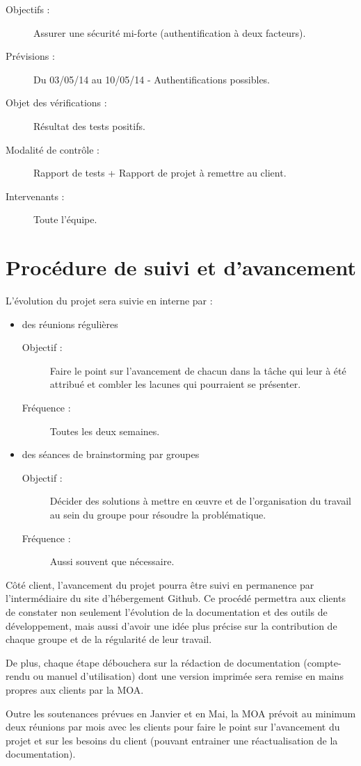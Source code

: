 \documentclass{../../res/univ-projet}
\begin{document}
\begin{description}
	\begin{description}
		\item[Objectifs :] Assurer une sécurité mi-forte (authentification à deux facteurs).
		\item[Prévisions :] Du 03/05/14 au 10/05/14 - Authentifications possibles.
		\item[Objet des vérifications :] Résultat des tests positifs.
		\item[Modalité de contrôle :] Rapport de tests + Rapport de projet à remettre au client.
		\item[Intervenants :] Toute l'équipe.
	\end{description}
	\vfill
\end{description}
\section{Procédure de suivi et d'avancement}

	L'évolution du projet sera suivie en interne par : 
	\begin{itemize}
		\item des réunions régulières 
		\begin{description}
			\item[Objectif :] Faire le point sur l'avancement de chacun dans la tâche qui leur à été attribué et combler les lacunes qui pourraient se présenter.
			\item[Fréquence :] Toutes les deux semaines.
		\end{description}
		\item des séances de brainstorming par groupes
		\begin{description}
			\item[Objectif :] Décider des solutions à mettre en œuvre et de l'organisation du travail au sein du groupe pour résoudre la problématique.
			\item[Fréquence :] Aussi souvent que nécessaire.
		\end{description}
	\end{itemize}

	Côté client, l'avancement du projet pourra être suivi en permanence par l'intermédiaire du site d'hébergement Github. Ce procédé permettra aux clients de constater non seulement l'évolution de la documentation et des outils de développement, mais aussi d'avoir une idée plus précise sur la contribution de chaque groupe et de la régularité de leur travail.

	De plus, chaque étape débouchera sur la rédaction de documentation (compte-rendu ou manuel d'utilisation) dont une version imprimée sera remise en mains propres aux clients par la MOA.


	Outre les soutenances prévues en Janvier et en Mai, la MOA prévoit au minimum deux réunions par mois avec les clients pour faire le point sur l'avancement du projet et sur les besoins du client (pouvant entrainer une réactualisation de la documentation).
\end{document}
